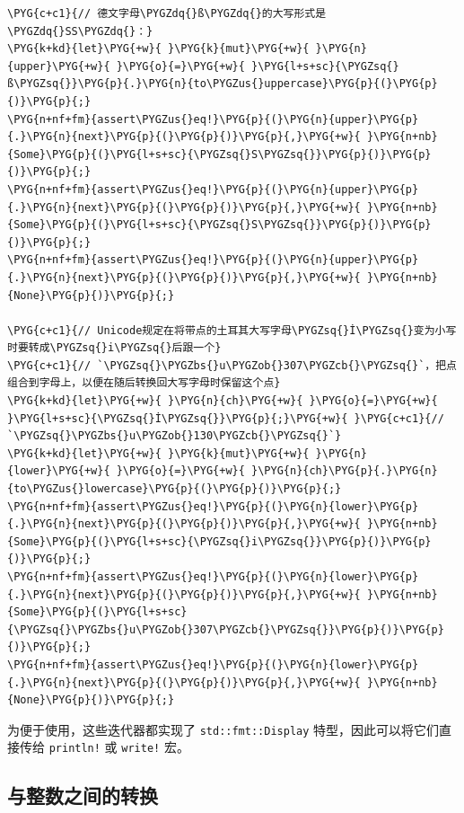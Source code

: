 \begin{Verbatim}[commandchars=\\\{\},breaklines=true,breakanywhere=true,fontsize=\codefont,xleftmargin=17bp]
\PYG{c+c1}{// 德文字母\PYGZdq{}ß\PYGZdq{}的大写形式是\PYGZdq{}SS\PYGZdq{}：}
\PYG{k+kd}{let}\PYG{+w}{ }\PYG{k}{mut}\PYG{+w}{ }\PYG{n}{upper}\PYG{+w}{ }\PYG{o}{=}\PYG{+w}{ }\PYG{l+s+sc}{\PYGZsq{}ß\PYGZsq{}}\PYG{p}{.}\PYG{n}{to\PYGZus{}uppercase}\PYG{p}{(}\PYG{p}{)}\PYG{p}{;}
\PYG{n+nf+fm}{assert\PYGZus{}eq!}\PYG{p}{(}\PYG{n}{upper}\PYG{p}{.}\PYG{n}{next}\PYG{p}{(}\PYG{p}{)}\PYG{p}{,}\PYG{+w}{ }\PYG{n+nb}{Some}\PYG{p}{(}\PYG{l+s+sc}{\PYGZsq{}S\PYGZsq{}}\PYG{p}{)}\PYG{p}{)}\PYG{p}{;}
\PYG{n+nf+fm}{assert\PYGZus{}eq!}\PYG{p}{(}\PYG{n}{upper}\PYG{p}{.}\PYG{n}{next}\PYG{p}{(}\PYG{p}{)}\PYG{p}{,}\PYG{+w}{ }\PYG{n+nb}{Some}\PYG{p}{(}\PYG{l+s+sc}{\PYGZsq{}S\PYGZsq{}}\PYG{p}{)}\PYG{p}{)}\PYG{p}{;}
\PYG{n+nf+fm}{assert\PYGZus{}eq!}\PYG{p}{(}\PYG{n}{upper}\PYG{p}{.}\PYG{n}{next}\PYG{p}{(}\PYG{p}{)}\PYG{p}{,}\PYG{+w}{ }\PYG{n+nb}{None}\PYG{p}{)}\PYG{p}{;}

\PYG{c+c1}{// Unicode规定在将带点的土耳其大写字母\PYGZsq{}İ\PYGZsq{}变为小写时要转成\PYGZsq{}i\PYGZsq{}后跟一个}
\PYG{c+c1}{// `\PYGZsq{}\PYGZbs{}u\PYGZob{}307\PYGZcb{}\PYGZsq{}`，把点组合到字母上，以便在随后转换回大写字母时保留这个点}
\PYG{k+kd}{let}\PYG{+w}{ }\PYG{n}{ch}\PYG{+w}{ }\PYG{o}{=}\PYG{+w}{ }\PYG{l+s+sc}{\PYGZsq{}İ\PYGZsq{}}\PYG{p}{;}\PYG{+w}{ }\PYG{c+c1}{// `\PYGZsq{}\PYGZbs{}u\PYGZob{}130\PYGZcb{}\PYGZsq{}`}
\PYG{k+kd}{let}\PYG{+w}{ }\PYG{k}{mut}\PYG{+w}{ }\PYG{n}{lower}\PYG{+w}{ }\PYG{o}{=}\PYG{+w}{ }\PYG{n}{ch}\PYG{p}{.}\PYG{n}{to\PYGZus{}lowercase}\PYG{p}{(}\PYG{p}{)}\PYG{p}{;}
\PYG{n+nf+fm}{assert\PYGZus{}eq!}\PYG{p}{(}\PYG{n}{lower}\PYG{p}{.}\PYG{n}{next}\PYG{p}{(}\PYG{p}{)}\PYG{p}{,}\PYG{+w}{ }\PYG{n+nb}{Some}\PYG{p}{(}\PYG{l+s+sc}{\PYGZsq{}i\PYGZsq{}}\PYG{p}{)}\PYG{p}{)}\PYG{p}{;}
\PYG{n+nf+fm}{assert\PYGZus{}eq!}\PYG{p}{(}\PYG{n}{lower}\PYG{p}{.}\PYG{n}{next}\PYG{p}{(}\PYG{p}{)}\PYG{p}{,}\PYG{+w}{ }\PYG{n+nb}{Some}\PYG{p}{(}\PYG{l+s+sc}{\PYGZsq{}\PYGZbs{}u\PYGZob{}307\PYGZcb{}\PYGZsq{}}\PYG{p}{)}\PYG{p}{)}\PYG{p}{;}
\PYG{n+nf+fm}{assert\PYGZus{}eq!}\PYG{p}{(}\PYG{n}{lower}\PYG{p}{.}\PYG{n}{next}\PYG{p}{(}\PYG{p}{)}\PYG{p}{,}\PYG{+w}{ }\PYG{n+nb}{None}\PYG{p}{)}\PYG{p}{;}
\end{Verbatim}

为便于使用，这些迭代器都实现了 \texttt{std::fmt::Display} 特型，因此可以将它们直接传给 \texttt{println!} 或 \texttt{write!} 宏。

\subsection{与整数之间的转换}

